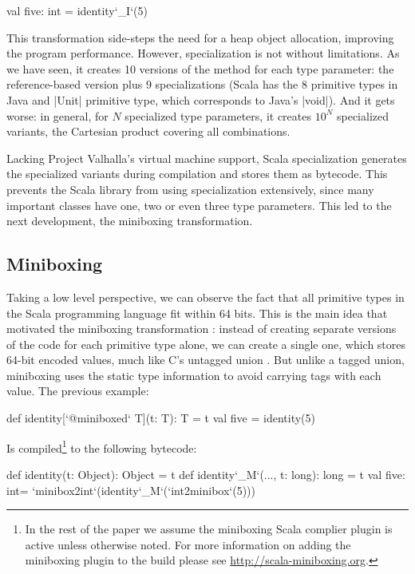\begin{lstlisting-nobreak}
 val five: int = identity`_I`(5)
\end{lstlisting-nobreak}

This transformation side-steps the need for a heap object allocation, improving the program performance. However, specialization is not without limitations. As we have seen, it creates 10 versions of the method for each type parameter: the reference-based version plus 9 specializations (Scala has the 8 primitive types in Java and |Unit| primitive type, which corresponds to Java's |void|). And it gets worse: in general, for $N$ specialized type parameters, it creates $10^N$ specialized variants, the Cartesian product covering all combinations.

Lacking Project Valhalla's virtual machine support, Scala specialization generates the specialized variants during compilation and stores them as bytecode. This prevents the Scala library from using specialization extensively, since many important classes have one, two or even three type parameters. This led to the next development, the miniboxing transformation.

\subsection{Miniboxing}

Taking a low level perspective, we can observe the fact that all primitive types in the Scala programming language fit within 64 bits. This is the main idea that motivated the miniboxing transformation \cite{miniboxing}: instead of creating separate versions of the code for each primitive type alone, we can create a single one, which stores 64-bit encoded values, much like C's untagged union \cite{tagged-unions-lua}. But unlike a tagged union, miniboxing uses the static type information to avoid carrying tags with each value. The previous example:

\begin{lstlisting-nobreak}
 def identity[`@miniboxed` T](t: T): T = t
 val five = identity(5)
\end{lstlisting-nobreak}

Is compiled\footnote{In the rest of the paper we assume the miniboxing Scala complier plugin is active unless otherwise noted. For more information on adding the miniboxing plugin to the build please see \url{http://scala-miniboxing.org}.} to the following bytecode:

\begin{lstlisting-nobreak}
 def identity(t: Object): Object = t
 def identity`_M`(..., t: long): long = t
 val five: int= `minibox2int`(identity`_M`(`int2minibox`(5)))
\end{lstlisting-nobreak}

